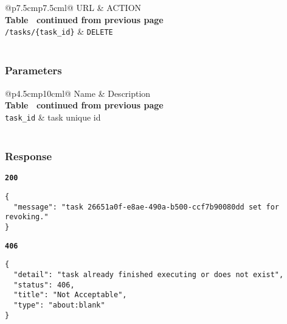 \begin{longtable}[c]{@{}p{7.5cm}p{7.5cm}l@{}}
  \toprule
  URL                          & ACTION                       \\* \midrule
  \endfirsthead
  \multicolumn{3}{c}%
  {{\bfseries Table \thetable\ continued from previous page}} \\
  \endhead
  \bottomrule
  \endfoot
  \endlastfoot
  \texttt{/tasks/\{task\_id\}} & \texttt{DELETE}              \\* \bottomrule
  \label{tab:rdf-validator-delete-task}                       \\
\end{longtable}

\subsubsection{Parameters}
\begin{longtable}[c]{@{}p{4.5cm}p{10cm}l@{}}
  \toprule
  Name              & Description                             \\* \midrule
  \endfirsthead
  \multicolumn{3}{c}%
  {{\bfseries Table \thetable\ continued from previous page}} \\
  \endhead
  \bottomrule
  \endfoot
  \endlastfoot
  \texttt{task\_id} & task unique id                          \\* \bottomrule
  \label{tab:rdf-validator-delete-task-parameters}            \\
\end{longtable}

\subsubsection{Response}
\textbf{\texttt{200}}
\begin{lstlisting}
{
  "message": "task 26651a0f-e8ae-490a-b500-ccf7b90080dd set for revoking."
}
\end{lstlisting}

\textbf{\texttt{406}}
\begin{lstlisting}
{
  "detail": "task already finished executing or does not exist",
  "status": 406,
  "title": "Not Acceptable",
  "type": "about:blank"
}
\end{lstlisting}